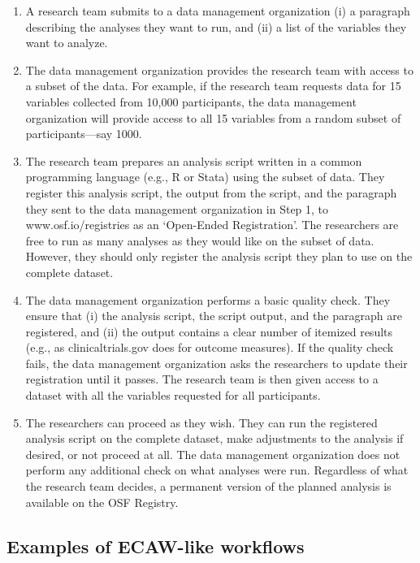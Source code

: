 \documentclass[
  man,floatsintext]{apa6}
\begin{document}
\begin{tcolorbox}
{\begin{enumerate}
  \item A research team submits to a data management organization (i) a paragraph describing the analyses they want to run, and (ii) a list of the variables they want to analyze.
  \item The data management organization provides the research team with access to a subset of the data. For example, if the research team requests data for 15 variables collected from 10,000 participants, the data management organization will provide access to all 15 variables from a random subset of participants—say 1000.
  \item The research team prepares an analysis script written in a common programming language (e.g., R or Stata) using the subset of data. They register this analysis script, the output from the script, and the paragraph they sent to the data management organization in Step 1, to www.osf.io/registries as an ‘Open-Ended Registration’. The researchers are free to run as many analyses as they would like on the subset of data. However, they should only register the analysis script they plan to use on the complete dataset.
  \item The data management organization performs a basic quality check. They ensure that (i) the analysis script, the script output, and the paragraph are registered, and (ii) the output contains a clear number of itemized results (e.g., as clinicaltrials.gov does for outcome measures). If the quality check fails, the data management organization asks the researchers to update their registration until it passes. The research team is then given access to a dataset with all the variables requested for all participants.
  \item The researchers can proceed as they wish. They can run the registered analysis script on the complete dataset, make adjustments to the analysis if desired, or not proceed at all. The data management organization does not perform any additional check on what analyses were run. Regardless of what the research team decides, a permanent version of the planned analysis is available on the OSF Registry.
\end{enumerate}
}
\end{tcolorbox}

\pagebreak

\hypertarget{examples-of-ecaw-like-workflows}{%
\subsection{Examples of ECAW-like workflows}\label{examples-of-ecaw-like-workflows}}
\end{document}
